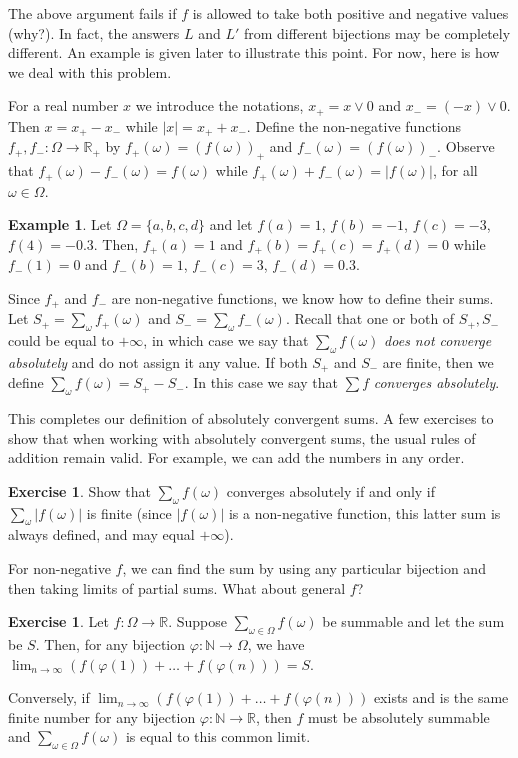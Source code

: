\documentclass[preprint,  11pt]{amsart}
\newcommand{\para}[1]{\vspace{4mm}\noindent{\bfseries #1:}}
\theoremstyle{plain} %
\theoremstyle{definition} %
\newtheorem{exercise}[theorem]{Exercise}
\newtheorem{example}[theorem]{Example}
\begin{document}
\para{Case II - General $f:\Omega\rightarrow \mathbb{R}$} The above argument fails if $f$ is allowed to take both positive and negative values (why?). In fact, the answers $L$ and $L'$ from different bijections may be completely different. An example is given later to illustrate this point. For now, here is how we deal with this problem. 

For a real number $x$ we introduce the notations, $x_{+}=x\vee 0$ and $x_{-}=(-x)\vee 0$. Then $x=x_{+}-x_{-}$ while $|x|=x_{+}+x_{-}$.  Define the non-negative functions $f_{+},f_{-}:\Omega\rightarrow \mathbb{R}_{+}$ by $f_{+}(\omega)=(f(\omega))_{+}$ and $f_{-}(\omega)=(f(\omega))_{-}$. Observe that $f_{+}(\omega)-f_{-}(\omega)=f(\omega)$ while $f_{+}(\omega)+f_{-}(\omega)=|f(\omega)|$, for all $\omega\in \Omega$. 
\begin{example} Let $\Omega=\{a,b,c,d\}$ and let $f(a)=1$, $f(b)=-1$, $f(c)=-3$, $f(4)=-0.3$. Then, $f_{+}(a)=1$ and $f_{+}(b)=f_{+}(c)=f_{+}(d)=0$ while $f_{-}(1)=0$ and $f_{-}(b)=1$, $f_{-}(c)=3$, $f_{-}(d)=0.3$.
\end{example} 
 
Since $f_{+}$ and $f_{-}$ are non-negative functions, we know how to define their sums. Let $S_{+}=\sum_{\omega}f_{+}(\omega)$ and $S_{-}=\sum_{\omega}f_{-}(\omega)$. Recall that one or both of $S_{+},S_{-}$ could be equal to $+\infty$, in which case we say that $\sum_{\omega}f(\omega)$ {\em does not converge absolutely} and do not assign it any value. If both $S_{+}$ and $S_{-}$ are finite, then we define $\sum_{\omega}f(\omega)= S_{+}-S_{-}$. In this case we say that $\sum f$ {\em converges absolutely}. 

This completes our definition of absolutely convergent sums. A few exercises to show that when working with absolutely convergent sums, the usual rules of addition remain valid. For example, we can add the numbers in any order.

\begin{exercise} Show that $\sum_{\omega}f(\omega)$ converges absolutely if and only if $\sum_{\omega}|f(\omega)|$ is finite (since $|f(\omega)|$ is a non-negative function, this latter sum is always defined, and may equal $+\infty$).
\end{exercise} 

For non-negative $f$, we can find the sum by using any particular bijection and then taking limits of partial sums. What about general $f$?
\begin{exercise} Let $f:\Omega \rightarrow \mathbb{R}$. Suppose $\sum_{\omega\in \Omega}f(\omega)$ be summable and let the sum be $S$. Then, for any bijection $\varphi:\mathbb{N}\rightarrow \Omega$, we have $\lim_{n\rightarrow \infty}(f(\varphi(1))+\ldots +f(\varphi(n)))=S$.

Conversely, if $\lim_{n\rightarrow \infty}(f(\varphi(1))+\ldots +f(\varphi(n)))$ exists and is the same finite number for any bijection $\varphi:\mathbb{N}\rightarrow \mathbb{R}$, then $f$ must be absolutely summable and $\sum_{\omega\in \Omega}f(\omega)$ is equal to this common limit.
\end{exercise}
\end{document}

